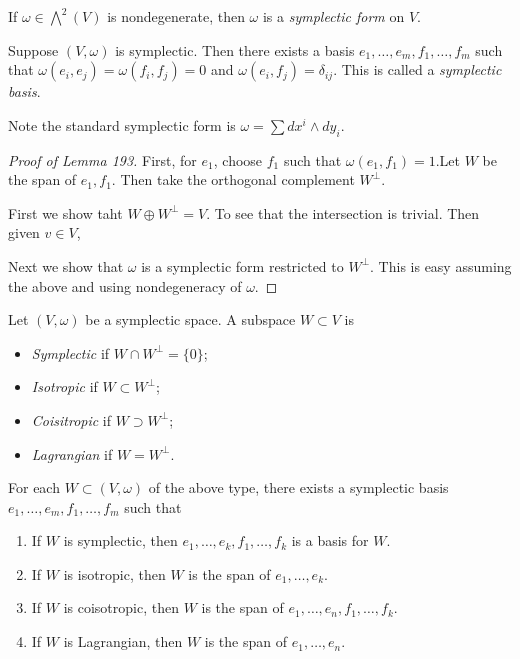\documentclass[twoside, 10pt]{article}
\begin{document}
    \begin{defn}
        If $\omega \in \bigwedge^2(V)$ is nondegenerate, then $\omega$ is a \textit{symplectic form} on $V$.
    \end{defn}

    \begin{lem}
        Suppose $(V,\omega)$ is symplectic. Then there exists a basis $e_1, \ldots, e_m, f_1, \ldots, f_m$ such that $\omega(e_i,e_j) = \omega(f_i,f_j) = 0$ and $\omega(e_i,f_j) = \delta_{ij}$. This is called a \textit{symplectic basis}.
    \end{lem}

    Note the standard symplectic form is $\omega = \sum dx^i \wedge dy_i$.

    \begin{proof}[Proof of Lemma 193]
        First, for $e_1$, choose $f_1$ such that $\omega(e_1,f_1) = 1. $Let $W$ be the span of $e_1,f_1$. Then take the orthogonal complement $W^{\perp}$.

        First we show taht $W \oplus W^{\perp} = V$. To see that the intersection is trivial. Then given $v \in V$, 

        Next we show that $\omega$ is a symplectic form restricted to $W^{\perp}$. This is easy assuming the above and using nondegeneracy of $\omega$.
    \end{proof}

    \begin{defn}
        Let $(V,\omega)$ be a symplectic space. A subspace $W \subset V$ is
        \begin{itemize}
            \item \textit{Symplectic} if $W \cap W^{\perp} = \{0\}$;
            \item \textit{Isotropic} if $W \subset W^{\perp}$;
            \item \textit{Coisitropic} if $W \supset W^{\perp}$;
            \item \textit{Lagrangian} if $W = W^{\perp}$.
        \end{itemize}
    \end{defn}

    \begin{exer}[Hw4 Problem 12-9]
        For each $W \subset (V,\omega)$ of the above type, there exists a symplectic basis $e_1, \ldots, e_m, f_1, \ldots, f_m$ such that 
        \begin{enumerate}
            \item If $W$ is symplectic, then $e_1, \ldots, e_k, f_1, \ldots, f_k$ is a basis for $W$.
            \item If $W$ is isotropic, then $W$ is the span of $e_1, \ldots, e_k$.
            \item If $W$ is coisotropic, then $W$ is the span of $e_1, \ldots, e_n, f_1, \ldots, f_k$.
            \item If $W$ is Lagrangian, then $W$ is the span of $e_1, \ldots, e_n$.
        \end{enumerate}
    \end{exer}
\end{document}
